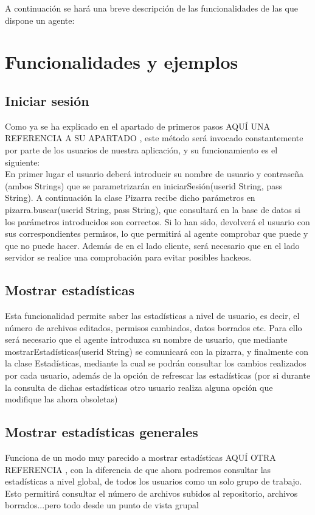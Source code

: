 A continuación se hará una breve descripción de las funcionalidades de las que dispone un agente:
\section{Funcionalidades y ejemplos}
\subsection{Iniciar sesión}
Como ya se ha explicado en el apartado de primeros pasos \color{red} AQUÍ UNA REFERENCIA A SU APARTADO \color{black} , este método será invocado constantemente por parte de los usuarios de nuestra aplicación, y su funcionamiento es el siguiente:\\
En primer lugar el usuario deberá introducir su nombre de usuario y contraseña (ambos Strings) que se parametrizarán en iniciarSesión(userid String, pass String). A continuación la clase Pizarra recibe dicho parámetros en pizarra.buscar(userid String, pass String), que consultará en la base de datos si los parámetros introducidos son correctos. Si lo han sido, devolverá el usuario con sus correspondientes permisos, lo que permitirá al agente comprobar que puede y que no puede hacer. Además de en el lado cliente, será necesario que en el lado servidor se realice una comprobación para evitar posibles hackeos.
\subsection{Mostrar estadísticas}
Esta funcionalidad permite saber las estadísticas a nivel de usuario, es decir, el número de archivos editados, permisos cambiados, datos borrados etc. Para ello será necesario que el agente introduzca su nombre de usuario, que mediante mostrarEstadísticas(userid String) se comunicará con la pizarra, y finalmente con la clase Estadísticas, mediante la cual se podrán consultar los cambios realizados por cada usuario, además de la opción de refrescar las estadísticas (por si durante la consulta de dichas estadísticas otro usuario realiza alguna opción que modifique las ahora obsoletas)
\subsection{Mostrar estadísticas generales}
Funciona de un modo muy parecido a mostrar estadísticas  \color{red} AQUÍ OTRA REFERENCIA \color{black}, con la diferencia de que ahora podremos consultar las estadísticas a nivel global, de todos los usuarios como un solo grupo de trabajo. Esto permitirá consultar el número de archivos subidos al repositorio, archivos borrados...pero todo desde un punto de vista grupal
